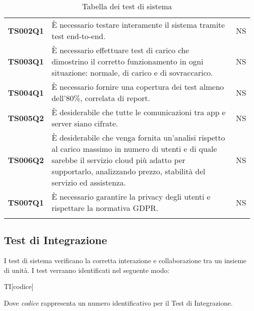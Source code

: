 \documentclass[../piano-di-qualifica.tex]{subfiles}
\begin{document}
\begin{centering}
\begin{longtable}[H]{>{\centering\bfseries}m{3cm} >{}p{10cm} >{\centering\arraybackslash}m{3cm}}
        TS002Q1 & È necessario testare interamente il sistema tramite test end-to-end. \newline
                & NS \\

        TS003Q1 & È necessario effettuare test di carico che dimostrino il corretto funzionamento in ogni situazione: normale, di carico e di sovraccarico. \newline
                & NS \\

        TS004Q1 &  È necessario fornire una copertura dei test almeno dell’80\%, correlata di report. \newline
                & NS \\

        TS005Q2 & È desiderabile che tutte le comunicazioni tra app e server siano cifrate. \newline
                & NS \\

        TS006Q2 & È desiderabile che venga fornita un’analisi rispetto al carico massimo in numero di utenti e di quale sarebbe il servizio cloud più adatto per supportarlo, analizzando prezzo, stabilità del servizio ed assistenza. \newline
                & NS \\

        TS007Q1 &  È necessario garantire la privacy degli utenti e rispettare la normativa GDPR\@. \newline
                & NS \\

        \caption{Tabella dei test di sistema}%
        \label{tab:test_sistema}
      \end{longtable}
    \end{centering}

\subsection{Test di Integrazione}%
\label{subs:test_di_integrazione}

I test di sistema verificano la corretta interazione e collaborazione tra un insieme di unità. I test verranno identificati nel seguente modo:
\begin{center}
  TI[codice]
\end{center}

Dove \textit{codice} rappresenta un numero identificativo per il Test di Integrazione.
\end{document}
